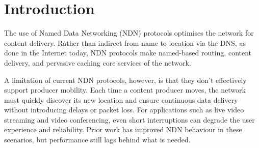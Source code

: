 \documentclass[10pt,conference]{IEEEtran}
\begin{document}
\section{Introduction}
\label{sec:introduction}

The use of Named Data Networking (NDN) protocols optimises the network for content delivery. Rather than indirect from name to location via the DNS, as done in the Internet today, NDN protocols make named-based routing, content delivery, and pervasive caching core services of the network.

A limitation of current NDN protocols, however, is that they don't effectively support producer mobility.  Each time a content producer moves, the network must quickly discover its new location and ensure continuous data delivery without introducing delays or packet loss. For applications such as live video streaming and video conferencing, even short interruptions can degrade the user experience and reliability. 
Prior work \cite{FIXME} has improved NDN behaviour in these scenarios, but performance still lags behind what is needed.

\end{document}
